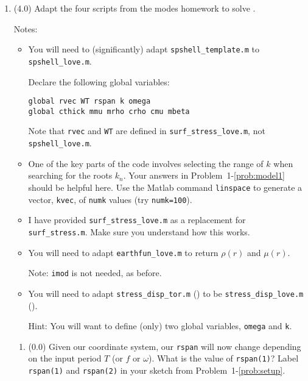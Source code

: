 \documentclass[11pt,titlepage,fleqn]{article}
\begin{document}
\begin{enumerate}

\item (4.0) Adapt the four scripts from the modes homework to solve .

Notes:
%
\begin{itemize}
\item You will need to (significantly) adapt \verb+spshell_template.m+ to \verb+spshell_love.m+. %

Declare the following global variables:
%
\begin{verbatim}
global rvec WT rspan k omega
global cthick mmu mrho crho cmu mbeta
\end{verbatim}
%
Note that \verb+rvec+ and \verb+WT+ are defined in \verb+surf_stress_love.m+, not \verb+spshell_love.m+.

\item One of the key parts of the code involves selecting the range of $k$ when searching for the roots $k_n$.
Your answers in Problem~1-\ref{prob:model1} should be helpful here.
Use the Matlab command \verb+linspace+ to generate a vector, \verb+kvec+, of \verb+numk+ values (try \verb+numk=100+).

\item I have provided \verb+surf_stress_love.m+ as a replacement for \verb+surf_stress.m+. Make sure you understand how this works.

\item You will need to adapt \verb+earthfun_love.m+ to return $\rho(r)$ and $\mu(r)$.

Note: \verb+imod+ is not needed, as before.

\item You will need to adapt \verb+stress_disp_tor.m+ () to be \verb+stress_disp_love.m+ ().

Hint: You will want to define (only) two global variables, \verb+omega+ and \verb+k+.

\end{itemize}

\begin{enumerate}
\item (0.0) Given our coordinate system, our \verb+rspan+ will now change depending on the input period $T$ (or $f$ or $\omega$). What is the value of \verb+rspan(1)+? Label \verb+rspan(1)+ and \verb+rspan(2)+ in your sketch from Problem~1-\ref{prob:setup}.


\end{enumerate}
\end{enumerate}
\end{document}
